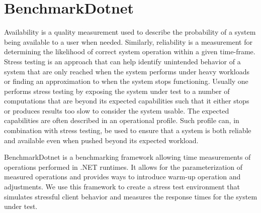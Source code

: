 \section*{BenchmarkDotnet}
Availability is a quality measurement used to describe the probability of a system being available to a user when needed. Similarly, reliability is a measurement for determining the likelihood of correct system operation within a given time-frame. \cite{reliabilityAvailability}
Stress testing is an approach that can help identify unintended behavior of a system that are only reached when the system performs under heavy workloads or finding an approximation to when the system stops functioning.
Usually one performs stress testing by exposing the system under test to a number of computations that are beyond its expected capabilities such that it either stops or produces results too slow to consider the system usable\cite{Sommerville10}.
The expected capabilities are often described in an operational profile\cite{OperationalProfiles}. 
Such profile can, in combination with stress testing, be used to ensure that a system is both reliable and available even when pushed beyond its expected workload.

BenchmarkDotnet\cite{Benchmarkdotnet} is a benchmarking framework allowing time measurements of operations performed in .NET runtimes.
It allows for the parameterization of measured operations and provides ways to introduce warm-up operation and adjustments.
We use this framework to create a stress test environment that simulates stressful client behavior and measures the response times for the system under test.